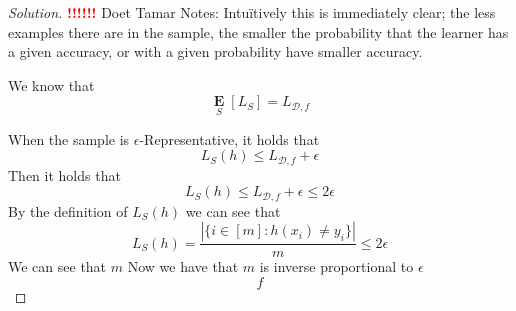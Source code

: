 \documentclass[10pt, a4paper, twoside]{amsart}
\newcommand{\R}{\ensuremath{\mathbb{R}}}
\DeclarePairedDelimiter\cbrac\{\}
\DeclarePairedDelimiter\paren()
\newcommand{\Ev}{\operatorname*{\ensuremath{\mathbf{E}}}} %
\newenvironment{solution}
               {\let\oldqedsymbol=\qedsymbol
                \renewcommand{\qedsymbol}{$\blacktriangleleft$}
                \begin{proof}[Solution]}
               {\end{proof}
                \renewcommand{\qedsymbol}{\oldqedsymbol}}
\newcommand{\TODO}{\textcolor{red}{\textbf{!!!!!! }}}
\begin{document}
\begin{solution}
\TODO Doet Tamar
  Notes:
Intu\"itively this is immediately clear; the less examples there are in the sample, the smaller the probability that the learner has a given accuracy, or with a given probability have smaller accuracy.
  
  We know that 
  \begin{equation*}
    \Ev_{S}[L_S] = L_{\mathcal{D},f}
  \end{equation*}
  
  When the sample is $\epsilon$-Representative, it holds that
  \begin{equation*}
    L_S(h) \leq L_{\mathcal{D},f} +\epsilon
  \end{equation*}
  Then it holds that
  \begin{equation*}
    L_S(h) \leq L_{\mathcal{D},f} +\epsilon \leq 2\epsilon
  \end{equation*}
  By the definition of $L_S(h)$ we can see that
  \begin{equation*}
    L_S(h) = \frac{|\{i \in[m]:h(x_i)\neq y_i \}|}{m} \leq 2\epsilon
  \end{equation*}
  We can see that $m$ 
  Now we have that $m$ is inverse proportional to $\epsilon$
  \begin{equation*}
f    
  \end{equation*}
  
  



\end{solution}
\end{document}
